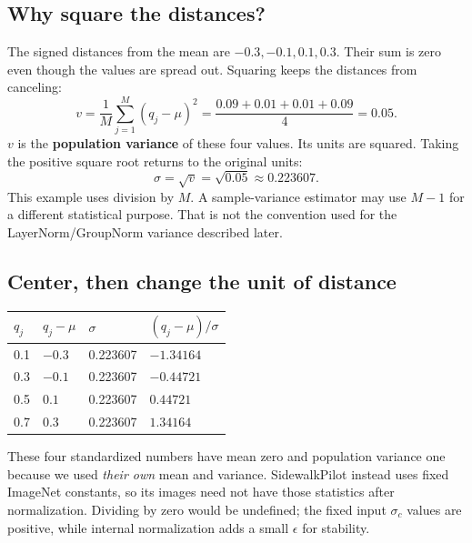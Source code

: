 \documentclass[11pt,letterpaper]{article}
\begin{document}
\subsection*{Why square the distances?}
The signed distances from the mean are $-0.3,-0.1,0.1,0.3$. Their sum is zero even though the values are spread out. Squaring keeps the distances from canceling:
\[
v=\frac{1}{M}\sum_{j=1}^{M}(q_j-\mu)^2
=\frac{0.09+0.01+0.01+0.09}{4}=0.05.
\]
$v$ is the \textbf{population variance} of these four values. Its units are squared. Taking the positive square root returns to the original units:
\[
\sigma=\sqrt{v}=\sqrt{0.05}\approx0.223607.
\]
This example uses division by $M$. A sample-variance estimator may use $M-1$ for a different statistical purpose. That is not the convention used for the LayerNorm/GroupNorm variance described later.

\begin{center}
\end{center}

\subsection*{Center, then change the unit of distance}
\begin{tabularx}{\linewidth}{@{}YYYY@{}}\toprule
$q_j$ & $q_j-\mu$ & $\sigma$ & $(q_j-\mu)/\sigma$\\ & $-0.3$ & 0.223607 & $-1.34164$\\
0.3 & $-0.1$ & 0.223607 & $-0.44721$\\
0.5 & $0.1$ & 0.223607 & $0.44721$\\
0.7 & $0.3$ & 0.223607 & $1.34164$\\\bottomrule
\end{tabularx}
These four standardized numbers have mean zero and population variance one because we used \emph{their own} mean and variance. SidewalkPilot instead uses fixed ImageNet constants, so its images need not have those statistics after normalization. Dividing by zero would be undefined; the fixed input $\sigma_c$ values are positive, while internal normalization adds a small $\epsilon$ for stability.
\end{document}
